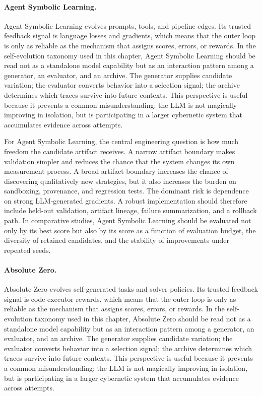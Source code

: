 \paragraph{Agent Symbolic Learning.} Agent Symbolic Learning evolves prompts, tools, and pipeline edges.  Its trusted feedback signal is language losses and gradients, which means that the outer loop is only as reliable as the mechanism that assigns scores, errors, or rewards.  In the self-evolution taxonomy used in this chapter, Agent Symbolic Learning should be read not as a standalone model capability but as an interaction pattern among a generator, an evaluator, and an archive.  The generator supplies candidate variation; the evaluator converts behavior into a selection signal; the archive determines which traces survive into future contexts.  This perspective is useful because it prevents a common misunderstanding: the LLM is not magically improving in isolation, but is participating in a larger cybernetic system that accumulates evidence across attempts.

For Agent Symbolic Learning, the central engineering question is how much freedom the candidate artifact receives.  A narrow artifact boundary makes validation simpler and reduces the chance that the system changes its own measurement process.  A broad artifact boundary increases the chance of discovering qualitatively new strategies, but it also increases the burden on sandboxing, provenance, and regression tests.  The dominant risk is dependence on strong LLM-generated gradients.  A robust implementation should therefore include held-out validation, artifact lineage, failure summarization, and a rollback path.  In comparative studies, Agent Symbolic Learning should be evaluated not only by its best score but also by its score as a function of evaluation budget, the diversity of retained candidates, and the stability of improvements under repeated seeds.

\paragraph{Absolute Zero.} Absolute Zero evolves self-generated tasks and solver policies.  Its trusted feedback signal is code-executor rewards, which means that the outer loop is only as reliable as the mechanism that assigns scores, errors, or rewards.  In the self-evolution taxonomy used in this chapter, Absolute Zero should be read not as a standalone model capability but as an interaction pattern among a generator, an evaluator, and an archive.  The generator supplies candidate variation; the evaluator converts behavior into a selection signal; the archive determines which traces survive into future contexts.  This perspective is useful because it prevents a common misunderstanding: the LLM is not magically improving in isolation, but is participating in a larger cybernetic system that accumulates evidence across attempts.

